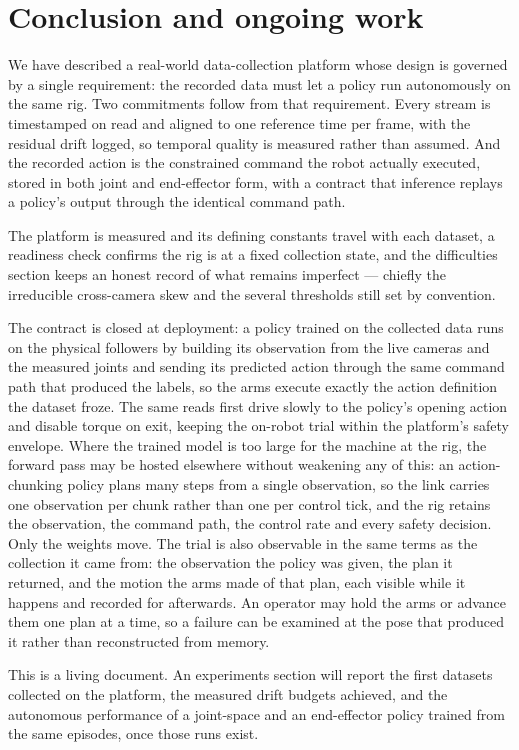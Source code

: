 \section{Conclusion and ongoing work}
\label{sec:conclusion}

We have described a real-world data-collection platform whose design is
governed by a single requirement: the recorded data must let a policy run
autonomously on the same rig. Two commitments follow from that requirement.
Every stream is timestamped on read and aligned to one reference time per
frame, with the residual drift logged, so temporal quality is measured
rather than assumed. And the recorded action is the constrained command the
robot actually executed, stored in both joint and end-effector form, with a
contract that inference replays a policy's output through the identical
command path.

The platform is measured and its defining constants travel with each
dataset, a readiness check confirms the rig is at a fixed collection state,
and the difficulties section keeps an honest record of what remains
imperfect --- chiefly the irreducible cross-camera skew and the several
thresholds still set by convention.

The contract is closed at deployment: a policy trained on the collected data
runs on the physical followers by building its observation from the live
cameras and the measured joints and sending its predicted action through the
same command path that produced the labels, so the arms execute exactly the
action definition the dataset froze. The same reads first drive slowly to the
policy's opening action and disable torque on exit, keeping the on-robot trial
within the platform's safety envelope. Where the trained model is too large for
the machine at the rig, the forward pass may be hosted elsewhere without
weakening any of this: an action-chunking policy plans many steps from a single
observation, so the link carries one observation per chunk rather than one per
control tick, and the rig retains the observation, the command path, the control
rate and every safety decision. Only the weights move. The trial is also
observable in the same terms as the collection it came from: the observation the
policy was given, the plan it returned, and the motion the arms made of that
plan, each visible while it happens and recorded for afterwards. An operator may
hold the arms or advance them one plan at a time, so a failure can be examined
at the pose that produced it rather than reconstructed from memory.

This is a living document. An experiments section will report the first
datasets collected on the platform, the measured drift budgets achieved,
and the autonomous performance of a joint-space and an end-effector policy
trained from the same episodes, once those runs exist.
